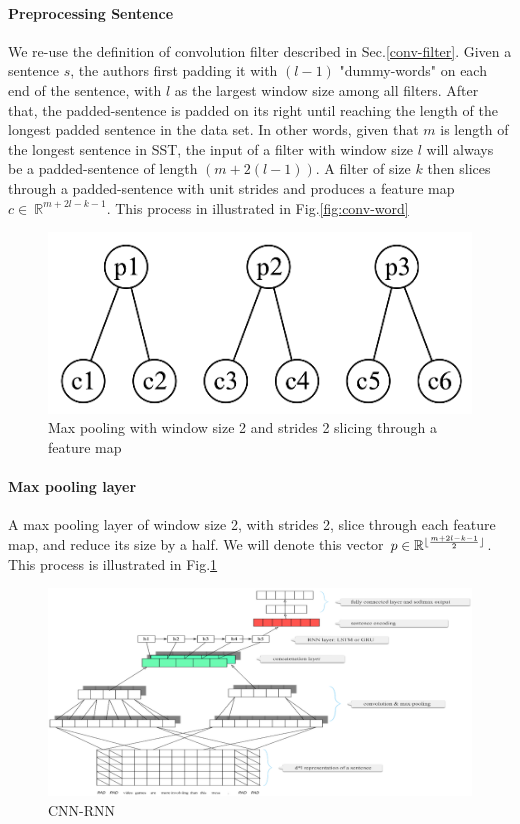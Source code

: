 \paragraph{Preprocessing Sentence} We re-use the definition of convolution filter described in Sec.\ref{conv-filter}.
Given a sentence \(s\), the authors first padding it with \((l-1)\) "dummy-words" on each end of the sentence, with \(l\) as the largest window size among all filters.
After that, the padded-sentence is padded on its right until reaching the length of the longest padded sentence in the data set.
In other words, given that \(m\) is length of the longest sentence in SST, the input of a filter with window size \(l\) will always be a padded-sentence of length \((m + 2(l-1))\).
A filter of size \(k\) then slices through a padded-sentence with unit strides and produces a feature map \(c \in \ \mathbb{R}^{m + 2l - k - 1}\).
This process in illustrated in Fig.\ref{fig:conv-word}

\begin{figure}[H]
    \centering    \includegraphics[scale=0.34]{figure/2-max}
    \caption[Max pooling policy]{Max pooling with window size 2 and strides 2 slicing through a feature map}
    \label{fig:2-max-pooling}
\end{figure}
  
\paragraph{Max pooling layer} A max pooling layer of window size 2, with strides 2, slice through each feature map, and reduce its size by a half.
We will denote this vector \(p \in \mathbb{R}^{\lfloor \frac{m + 2l - k - 1}{2} \rfloor} \). 
This process is illustrated in Fig.\ref{fig:2-max-pooling}   


\begin{figure}[H]
    \raggedleft    \includegraphics[scale=0.425]{figure/cnn-rnn}
    \caption{CNN-RNN}
    \label{fig:cnn-rnn}
\end{figure}

